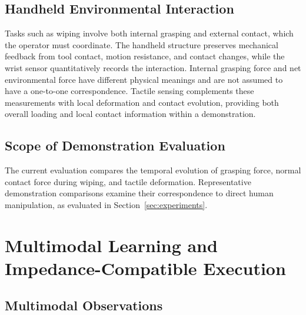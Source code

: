 \subsection{Handheld Environmental Interaction}

Tasks such as wiping involve both internal grasping and external contact, which the operator must coordinate.
The handheld structure preserves mechanical feedback from tool contact, motion resistance, and contact changes, while the wrist sensor quantitatively records the interaction.
Internal grasping force and net environmental force have different physical meanings and are not assumed to have a one-to-one correspondence.
Tactile sensing complements these measurements with local deformation and contact evolution, providing both overall loading and local contact information within a demonstration.

\subsection{Scope of Demonstration Evaluation}

The current evaluation compares the temporal evolution of grasping force, normal contact force during wiping, and tactile deformation.
Representative demonstration comparisons examine their correspondence to direct human manipulation, as evaluated in Section~\ref{sec:experiments}.

\section{Multimodal Learning and Impedance-Compatible Execution}
\label{sec:learning_execution}

\subsection{Multimodal Observations}

